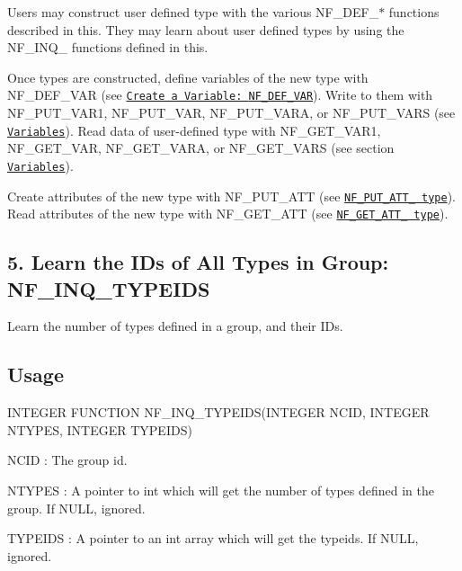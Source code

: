Users may construct user defined type with the various N\+F\+\_\+\+D\+E\+F\+\_\+$\ast$ functions described in this. They may learn about user defined types by using the N\+F\+\_\+\+I\+N\+Q\+\_\+ functions defined in this.

Once types are constructed, define variables of the new type with N\+F\+\_\+\+D\+E\+F\+\_\+\+V\+AR (see \href{#NF_005fDEF_005fVAR}{\tt Create a Variable\+: {\ttfamily N\+F\+\_\+\+D\+E\+F\+\_\+\+V\+AR}}). Write to them with N\+F\+\_\+\+P\+U\+T\+\_\+\+V\+A\+R1, N\+F\+\_\+\+P\+U\+T\+\_\+\+V\+AR, N\+F\+\_\+\+P\+U\+T\+\_\+\+V\+A\+RA, or N\+F\+\_\+\+P\+U\+T\+\_\+\+V\+A\+RS (see \href{#Variables}{\tt Variables}). Read data of user-\/defined type with N\+F\+\_\+\+G\+E\+T\+\_\+\+V\+A\+R1, N\+F\+\_\+\+G\+E\+T\+\_\+\+V\+AR, N\+F\+\_\+\+G\+E\+T\+\_\+\+V\+A\+RA, or N\+F\+\_\+\+G\+E\+T\+\_\+\+V\+A\+RS (see section \href{#Variables}{\tt Variables}).

Create attributes of the new type with N\+F\+\_\+\+P\+U\+T\+\_\+\+A\+TT (see \href{#NF_005fPUT_005fATT_005f-type}{\tt N\+F\+\_\+\+P\+U\+T\+\_\+\+A\+T\+T\+\_\+ type}). Read attributes of the new type with N\+F\+\_\+\+G\+E\+T\+\_\+\+A\+TT (see \href{#NF_005fGET_005fATT_005f-type}{\tt N\+F\+\_\+\+G\+E\+T\+\_\+\+A\+T\+T\+\_\+ type}).\hypertarget{nc_f77_interface_guide_f77_NF-INQ-TYPEIDS}{}\subsection{5. Learn the I\+Ds of All Types in Group\+: N\+F\+\_\+\+I\+N\+Q\+\_\+\+T\+Y\+P\+E\+I\+D\+S }\label{nc_f77_interface_guide_f77_NF-INQ-TYPEIDS}
Learn the number of types defined in a group, and their I\+Ds.

\subsection*{Usage }

I\+N\+T\+E\+G\+ER F\+U\+N\+C\+T\+I\+ON N\+F\+\_\+\+I\+N\+Q\+\_\+\+T\+Y\+P\+E\+I\+DS(I\+N\+T\+E\+G\+ER N\+C\+ID, I\+N\+T\+E\+G\+ER N\+T\+Y\+P\+ES, I\+N\+T\+E\+G\+ER T\+Y\+P\+E\+I\+DS)

{\ttfamily N\+C\+ID} \+: The group id.

{\ttfamily N\+T\+Y\+P\+ES} \+: A pointer to int which will get the number of types defined in the group. If N\+U\+LL, ignored.

{\ttfamily T\+Y\+P\+E\+I\+DS} \+: A pointer to an int array which will get the typeids. If N\+U\+LL, ignored.

